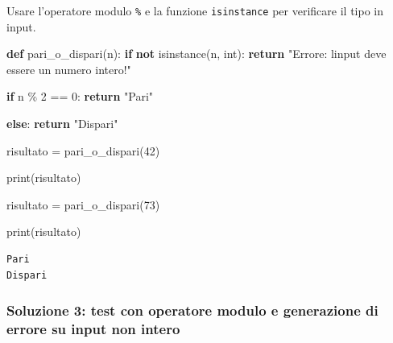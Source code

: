 \documentclass[
  letterpaper,
]{scrbook}
\newenvironment{Shaded}{\begin{snugshade}}{\end{snugshade}}
\newcommand{\BuiltInTok}[1]{\textcolor[rgb]{0.00,0.23,0.31}{#1}}
\newcommand{\ControlFlowTok}[1]{\textcolor[rgb]{0.00,0.23,0.31}{\textbf{#1}}}
\newcommand{\DecValTok}[1]{\textcolor[rgb]{0.68,0.00,0.00}{#1}}
\newcommand{\KeywordTok}[1]{\textcolor[rgb]{0.00,0.23,0.31}{\textbf{#1}}}
\newcommand{\NormalTok}[1]{\textcolor[rgb]{0.00,0.23,0.31}{#1}}
\newcommand{\OperatorTok}[1]{\textcolor[rgb]{0.37,0.37,0.37}{#1}}
\newcommand{\StringTok}[1]{\textcolor[rgb]{0.13,0.47,0.30}{#1}}
\begin{document}
\begin{tcolorbox}[enhanced jigsaw, leftrule=.75mm, arc=.35mm, opacityback=0, rightrule=.15mm, titlerule=0mm, colbacktitle=quarto-callout-tip-color!10!white, colback=white, colframe=quarto-callout-tip-color-frame, bottomrule=.15mm, toprule=.15mm, bottomtitle=1mm, toptitle=1mm, title=\textcolor{quarto-callout-tip-color}{\faLightbulb}\hspace{0.5em}{Suggerimento}, breakable, coltitle=black, opacitybacktitle=0.6, left=2mm]

Usare l'operatore modulo \texttt{\%} e la funzione \texttt{isinstance}
per verificare il tipo in input.

\end{tcolorbox}

\begin{Shaded}
\begin{Highlighting}[]
\KeywordTok{def}\NormalTok{ pari\_o\_dispari(n):}
  \ControlFlowTok{if} \KeywordTok{not} \BuiltInTok{isinstance}\NormalTok{(n, }\BuiltInTok{int}\NormalTok{):}
    \ControlFlowTok{return} \StringTok{"Errore: l\textquotesingle{}input deve essere un numero intero!"}
    
  \ControlFlowTok{if}\NormalTok{ n }\OperatorTok{\%} \DecValTok{2} \OperatorTok{==} \DecValTok{0}\NormalTok{:}
    \ControlFlowTok{return} \StringTok{"Pari"}

  \ControlFlowTok{else}\NormalTok{:}
    \ControlFlowTok{return} \StringTok{"Dispari"}

\NormalTok{risultato }\OperatorTok{=}\NormalTok{ pari\_o\_dispari(}\DecValTok{42}\NormalTok{)}

\BuiltInTok{print}\NormalTok{(risultato)}

\NormalTok{risultato }\OperatorTok{=}\NormalTok{ pari\_o\_dispari(}\DecValTok{73}\NormalTok{)}

\BuiltInTok{print}\NormalTok{(risultato)}
\end{Highlighting}
\end{Shaded}

\begin{verbatim}
Pari
Dispari
\end{verbatim}

\subsubsection{Soluzione 3: test con operatore modulo e generazione di
errore su input non
intero}\label{soluzione-3-test-con-operatore-modulo-e-generazione-di-errore-su-input-non-intero}
\end{document}
